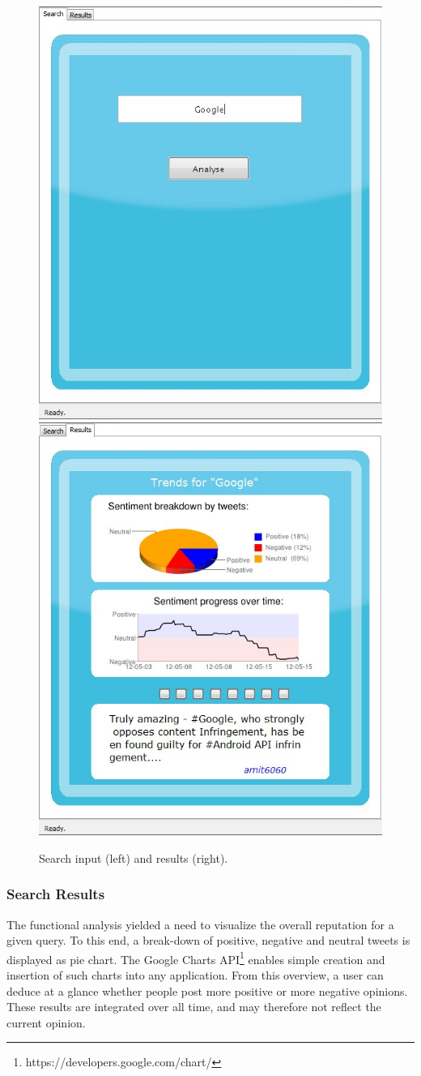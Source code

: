 \begin{figure}[h]
\includegraphics[width=0.5\columnwidth]{./images/search_input.jpg}
\includegraphics[width=0.5\columnwidth]{./images/search_results.jpg}
\caption{Search input (left) and results (right).}
\label{fig:gui_search}
\end{figure}

\subsubsection{Search Results}
The functional analysis yielded a need to visualize the overall reputation for a given query. To this end, a break-down of positive, negative and neutral tweets is displayed as pie chart. The Google Charts API\footnote{https://developers.google.com/chart/} enables simple creation and insertion of such charts into any application. From this overview, a user can deduce at a glance whether people post more positive or more negative opinions. These results are integrated over all time, and may therefore not reflect the current opinion.

